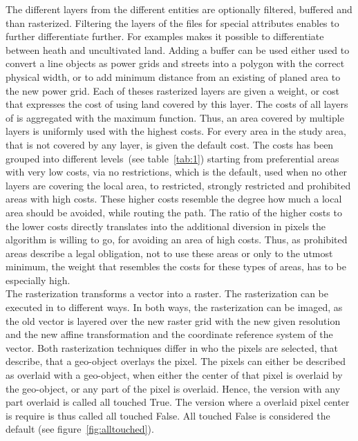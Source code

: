 \documentclass[acmtog]{acmart}
\begin{document}
	The different layers from the different entities are optionally filtered, buffered and than rasterized.
	Filtering the layers of the files for special attributes enables to further differentiate further.
	For examples makes it possible to differentiate between heath and uncultivated land.
	Adding a buffer can be used either used to convert a line objects as power grids and streets into a polygon with the
	correct physical width, or to add minimum distance from an existing of planed area to the new power grid.
 	Each of theses rasterized layers are given a weight, or cost that expresses the cost of using land covered by this layer.
 	The costs of all layers of is aggregated with the maximum function.
	Thus, an area covered by multiple layers is uniformly used with the highest costs.
	For every area in the study area, that is not covered by any layer, is given the default cost.
	The costs has been grouped into different levels~(see table~\ref{tab:1}) starting from preferential areas with
	very low costs, via no restrictions, which is the default, used when no other layers are covering the local area,
	to restricted, strongly restricted and prohibited areas with high costs.
	These higher costs resemble the degree how much a local area should be avoided, while routing the path.
	The ratio of the higher costs to the lower costs directly translates into the additional diversion in pixels
	the algorithm is willing to go, for avoiding an area of high costs.
	Thus, as prohibited areas describe a legal obligation, not to use these areas or only to the utmost minimum,
	the weight that resembles the costs for these types of areas, has to be especially high. \\
	The rasterization transforms a vector into a raster.
	The rasterization can be executed in to different ways.
	In both ways, the rasterization can be imaged, as the old vector is layered over the new raster grid with the new
	given resolution and the new affine transformation and the coordinate reference system of the vector.
	Both rasterization techniques differ  in who the pixels are selected, that describe, that a geo-object overlays the pixel.
	The pixels can either be described as overlaid with a geo-object, when either the center of that pixel is overlaid
	by the geo-object, or any part of the pixel is overlaid.
	Hence, the version with any part overlaid is called all touched True.
	The version where a overlaid pixel center is require is thus called all touched False.
	All touched False is considered the default (see figure~\ref{fig:alltouched}).
\end{document}
